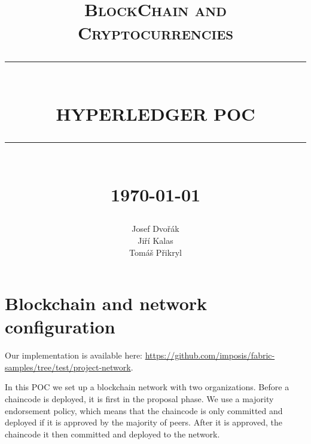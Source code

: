 \documentclass[12pt]{article}
\newcommand{\HRule}[1]{\rule{\linewidth}{#1}}
\begin{document}
\begin{titlepage}
  \title{ \normalsize \textsc{BlockChain and Cryptocurrencies}
      \\ [2.0cm]
      \HRule{0.5pt} \\
      \LARGE \textbf{\uppercase{HyperLedger POC}}
      \HRule{2pt} \\ [0.5cm]
      \normalsize \today \vspace*{5\baselineskip}}

  \date{}

  \author{
      Josef Dvořák \\
      Jiří Kalas \\
      Tomáš Přikryl }

  \thispagestyle{empty}
  \maketitle
  \thispagestyle{fancy}
\end{titlepage}
\newpage

\tableofcontents
\newpage

\section{Blockchain and network configuration}

Our implementation is available here: \url{https://github.com/imposis/fabric-samples/tree/test/project-network}.

In this POC we set up a blockchain network with two organizations.
Before a chaincode is deployed, it is first in the proposal phase.
We use a majority endorsement policy, which means that the chaincode is only committed and deployed if it is approved by the majority of peers.
After it is approved, the chaincode it then committed and deployed to the network.
\end{document}

